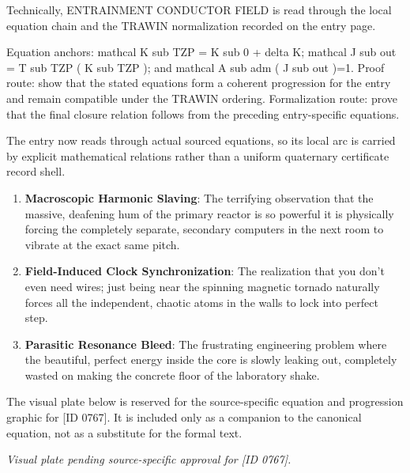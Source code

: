 Technically, ENTRAINMENT CONDUCTOR FIELD is read through the local equation chain and the TRAWIN normalization recorded on the entry page.

Equation anchors: mathcal K sub TZP = K sub 0 + delta K; mathcal J sub out = T sub TZP ( K sub TZP ); and mathcal A sub adm ( J sub out )=1. Proof route: show that the stated equations form a coherent progression for the entry and remain compatible under the TRAWIN ordering. Formalization route: prove that the final closure relation follows from the preceding entry-specific equations.

The entry now reads through actual sourced equations, so its local arc is carried by explicit mathematical relations rather than a uniform quaternary certificate record shell.
\endgroup

\begin{enumerate}[leftmargin=1.6em,itemsep=6pt,topsep=4pt]
\item \textbf{Macroscopic Harmonic Slaving}: The terrifying observation that the massive, deafening hum of the primary reactor is so powerful it is physically forcing the completely separate, secondary computers in the next room to vibrate at the exact same pitch.
\item \textbf{Field-Induced Clock Synchronization}: The realization that you don't even need wires; just being near the spinning magnetic tornado naturally forces all the independent, chaotic atoms in the walls to lock into perfect step.
\item \textbf{Parasitic Resonance Bleed}: The frustrating engineering problem where the beautiful, perfect energy inside the core is slowly leaking out, completely wasted on making the concrete floor of the laboratory shake.
\end{enumerate}

\begingroup\footnotesize\sloppy
The visual plate below is reserved for the source-specific equation and progression graphic for [ID 0767]. It is included only as a companion to the canonical equation, not as a substitute for the formal text.
\par\endgroup
\begingroup\footnotesize\itshape
Visual plate pending source-specific approval for [ID 0767].
\par\endgroup

